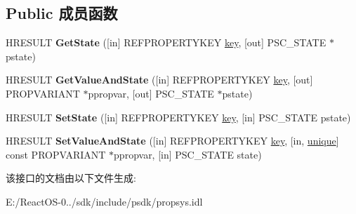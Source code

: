 \subsection*{Public 成员函数}
\begin{DoxyCompactItemize}
\item 
\mbox{\label{interface_i_property_store_cache_abf52c3cc3eb78afad28b7976f182d624}} 
H\+R\+E\+S\+U\+LT {\bfseries Get\+State} (\mbox{[}in\mbox{]} R\+E\+F\+P\+R\+O\+P\+E\+R\+T\+Y\+K\+EY \hyperlink{structkey}{key}, \mbox{[}out\mbox{]} P\+S\+C\+\_\+\+S\+T\+A\+TE $\ast$pstate)
\item 
\mbox{\label{interface_i_property_store_cache_a5d4c595a15c68d33cd5f4f35ab1d69e8}} 
H\+R\+E\+S\+U\+LT {\bfseries Get\+Value\+And\+State} (\mbox{[}in\mbox{]} R\+E\+F\+P\+R\+O\+P\+E\+R\+T\+Y\+K\+EY \hyperlink{structkey}{key}, \mbox{[}out\mbox{]} P\+R\+O\+P\+V\+A\+R\+I\+A\+NT $\ast$ppropvar, \mbox{[}out\mbox{]} P\+S\+C\+\_\+\+S\+T\+A\+TE $\ast$pstate)
\item 
\mbox{\label{interface_i_property_store_cache_a04debee1506fcb89e77b731c181a3387}} 
H\+R\+E\+S\+U\+LT {\bfseries Set\+State} (\mbox{[}in\mbox{]} R\+E\+F\+P\+R\+O\+P\+E\+R\+T\+Y\+K\+EY \hyperlink{structkey}{key}, \mbox{[}in\mbox{]} P\+S\+C\+\_\+\+S\+T\+A\+TE pstate)
\item 
\mbox{\label{interface_i_property_store_cache_a726332d42cae5565add65025141e03ff}} 
H\+R\+E\+S\+U\+LT {\bfseries Set\+Value\+And\+State} (\mbox{[}in\mbox{]} R\+E\+F\+P\+R\+O\+P\+E\+R\+T\+Y\+K\+EY \hyperlink{structkey}{key}, \mbox{[}in, \hyperlink{interfaceunique}{unique}\mbox{]} const P\+R\+O\+P\+V\+A\+R\+I\+A\+NT $\ast$ppropvar, \mbox{[}in\mbox{]} P\+S\+C\+\_\+\+S\+T\+A\+TE state)
\end{DoxyCompactItemize}


该接口的文档由以下文件生成\+:\begin{DoxyCompactItemize}
\item 
E\+:/\+React\+O\+S-\/0../sdk/include/psdk/propsys.\+idl\end{DoxyCompactItemize}
